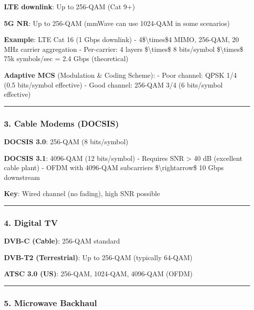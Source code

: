 \textbf{LTE downlink}: Up to 256-QAM (Cat 9+)

\textbf{5G NR}: Up to 256-QAM (mmWave can use 1024-QAM in some
scenarios)

\textbf{Example}: LTE Cat 16 (1 Gbps downlink) -
4\$\textbackslash times\$4 MIMO, 256-QAM, 20 MHz carrier aggregation -
Per-carrier: 4 layers \$\textbackslash times\$ 8 bits/symbol
\$\textbackslash times\$ 75k symbols/sec = 2.4 Gbps (theoretical)

\textbf{Adaptive MCS} (Modulation \& Coding Scheme): - Poor channel:
QPSK 1/4 (0.5 bits/symbol effective) - Good channel: 256-QAM 3/4 (6
bits/symbol effective)

\begin{center}\rule{0.5\linewidth}{0.5pt}\end{center}

\subsubsection{3. Cable Modems (DOCSIS)}\label{cable-modems-docsis}

\textbf{DOCSIS 3.0}: 256-QAM (8 bits/symbol)

\textbf{DOCSIS 3.1}: 4096-QAM (12 bits/symbol) - Requires SNR
\textgreater{} 40 dB (excellent cable plant) - OFDM with 4096-QAM
subcarriers \$\textbackslash rightarrow\$ 10 Gbps downstream

\textbf{Key}: Wired channel (no fading), high SNR possible

\begin{center}\rule{0.5\linewidth}{0.5pt}\end{center}

\subsubsection{4. Digital TV}\label{digital-tv}

\textbf{DVB-C (Cable)}: 256-QAM standard

\textbf{DVB-T2 (Terrestrial)}: Up to 256-QAM (typically 64-QAM)

\textbf{ATSC 3.0 (US)}: 256-QAM, 1024-QAM, 4096-QAM (OFDM)

\begin{center}\rule{0.5\linewidth}{0.5pt}\end{center}

\subsubsection{5. Microwave Backhaul}\label{microwave-backhaul}

